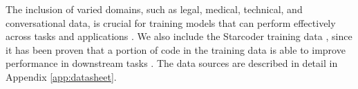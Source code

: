 The inclusion of varied domains, such as legal, medical, technical, and conversational data, is crucial for training models that can perform effectively across tasks and applications \cite{hashimoto_model_2021, miranda_beyond_2023, xie_doremi_2023, fan_doge_2023}. 
We also include the Starcoder training data \cite{li_starcoder_2023}%
, since it has been proven that a portion of code in the training data is able to improve performance in downstream tasks \cite{muennighoff_scaling_2023, liang_holistic_2023, ma_at_2023}. 
The data sources are described in detail in Appendix \ref{app:datasheet}.




